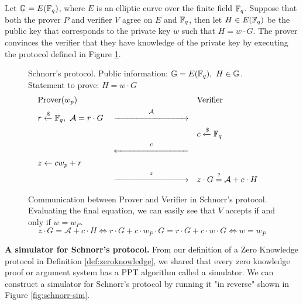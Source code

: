 \begin{definition}
Let $\mathbb{G} = E(\mathbb{F}_q)$, where $E$ is an elliptic curve over the finite field $\mathbb{F}_q$. Suppose that both the prover $P$ and verifier $V$ agree on $E$ and $\mathbb{F}_q$, then let $H \in E(\mathbb{F}_q)$ be the public key that corresponds to the private key $w$ such that $H = w \cdot G$. The prover convinces the verifier that they have knowledge of the private key by executing the protocol defined in Figure \ref{prot:schnorr}.

\begin{figure}[h]
    \centering
    \begin{protocol}[]{Schnorr's protocol. Public information: $\mathbb{G} = E(\mathbb{F}_q),\ H \in \mathbb{G}$. Statement to prove: $H = w \cdot G$} 
       \vspace{-0.5cm}
       \begin{align*}
           &\text{Prover}(w_p)& 
           &&
           &\text{Verifier}& 
           \\
           &r \samplefrom \F_q,\ \mathcal A = r \cdot G&
           &\overset  {\mathcal A} {\xrightarrow{\hspace{3cm}}}&
           && 
           \\
           &&
           &&
           &c \samplefrom \F_q&
           \\
           &&
           &\overset c {\xleftarrow{\hspace{3cm}}}&
           &&
           \\
           &z \leftarrow cw_p + r&
           &&
           && 
           \\
           &&
           &\overset {z} {\xrightarrow{\hspace{3cm}}}&
           &z \cdot G \verify \mathcal A + c \cdot H&
       \end{align*}
    \end{protocol}
   \caption{Communication between Prover and Verifier in Schnorr's protocol. Evaluating the final equation, we can easily see that $V$ accepts if and only if $w = w_P$.
    \[
    z \cdot G = \mathcal A + c \cdot H \iff
    r \cdot G + c \cdot w_P \cdot G  = r \cdot G + c \cdot w \cdot G \iff
    w  =  w_P
    \]
    }
   \label{prot:schnorr}
\end{figure}

\end{definition}



\textbf{A simulator for Schnorr's protocol.} From our definition of a Zero Knowledge protocol in Definition \ref{def:zeroknowledge}, we shared that every zero knowledge proof or argument system has a PPT algorithm called a simulator. We can construct a simulator for Schnorr's protocol by running it "in reverse" shown in Figure \ref{fig:schnorr-sim}.

